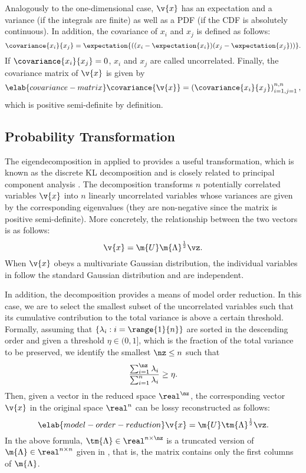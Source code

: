 Analogously to the one-dimensional case, $\v{x}$ has an expectation and a
variance (if the integrals are finite) as well as a \ac{PDF} (if the \ac{CDF} is
absolutely continuous). In addition, the covariance of $x_i$ and $x_j$ is
defined as follows:
\[
  \covariance{x_i}{x_j} = \expectation{((x_i - \expectation{x_i})(x_j - \expectation{x_j}))}.
\]
If $\covariance{x_i}{x_j} = 0$, $x_i$ and $x_j$ are called uncorrelated.
Finally, the covariance matrix of $\v{x}$ is given by
\begin{equation} \elab{covariance-matrix}
  \covariance{\v{x}} = \left(\covariance{x_i}{x_j}\right)_{i = 1, j = 1}^{n, n},
\end{equation}
which is positive semi-definite by definition.

\subsection{Probability Transformation}

The eigendecomposition in  applied to
 provides a useful transformation, which is known as the
discrete \ac{KL} decomposition \cite{ghanem1991, xiu2010} and is closely related
to principal component analysis \cite{hastie2013}. The decomposition transforms
$n$ potentially correlated variables $\v{x}$ into $n$ linearly uncorrelated
variables \vz whose variances are given by the corresponding eigenvalues (they
are non-negative since the matrix is positive semi-definite). More concretely,
the relationship between the two vectors is as follows:
\[
  \v{x} = \m{U} \m{\Lambda}^\frac{1}{2} \vz.
\]
When $\v{x}$ obeys a multivariate Gaussian distribution, the individual
variables in \vz follow the standard Gaussian distribution and are independent.

In addition, the decomposition provides a means of model order reduction. In
this case, we are to select the smallest subset of the uncorrelated variables
such that its cumulative contribution to the total variance is above a certain
threshold. Formally, assuming that $\{ \lambda_i: i = \range{1}{n} \}$ are
sorted in the descending order and given a threshold $\eta \in (0, 1]$, which is
the fraction of the total variance to be preserved, we identify the smallest
$\nz \leq n$ such that
\[
  \frac{\sum_{i = 1}^\nz \lambda_i}{\sum_{i = 1}^n \lambda_i} \geq \eta.
\]
Then, given a vector \vz in the reduced space $\real^\nz$, the corresponding
vector $\v{x}$ in the original space $\real^n$ can be lossy reconstructed as
follows:
\begin{equation} \elab{model-order-reduction}
  \v{x} = \m{U} \tm{\Lambda}^\frac{1}{2} \vz.
\end{equation}
In the above formula, $\tm{\Lambda} \in \real^{n \times \nz}$ is a truncated
version of $\m{\Lambda} \in \real^{n \times n}$ given in
, that is, the matrix contains only the first \nz
columns of $\m{\Lambda}$.

